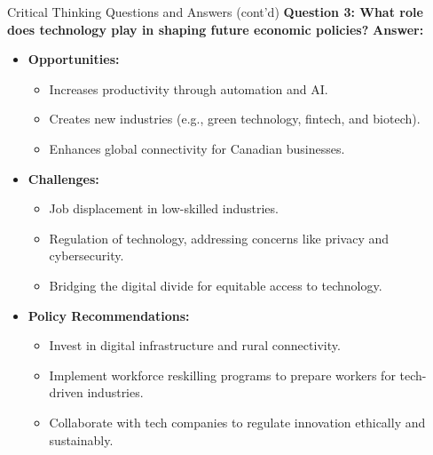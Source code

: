 \begin{frame}{Critical Thinking Questions and Answers (cont'd)}
  \textbf{Question 3: What role does technology play in shaping future economic policies?}
  \pause
  \textbf{Answer:}
  \begin{itemize}
    \item \textbf{Opportunities:}
      \begin{itemize}
        \item Increases productivity through automation and AI.
        \item Creates new industries (e.g., green technology, fintech, and biotech).
        \item Enhances global connectivity for Canadian businesses.
      \end{itemize}
    \item \textbf{Challenges:}
      \begin{itemize}
        \item Job displacement in low-skilled industries.
        \item Regulation of technology, addressing concerns like privacy and cybersecurity.
        \item Bridging the digital divide for equitable access to technology.
      \end{itemize}
    \item \textbf{Policy Recommendations:}
      \begin{itemize}
        \item Invest in digital infrastructure and rural connectivity.
        \item Implement workforce reskilling programs to prepare workers for tech-driven industries.
        \item Collaborate with tech companies to regulate innovation ethically and sustainably.
      \end{itemize}
  \end{itemize}
\end{frame}
